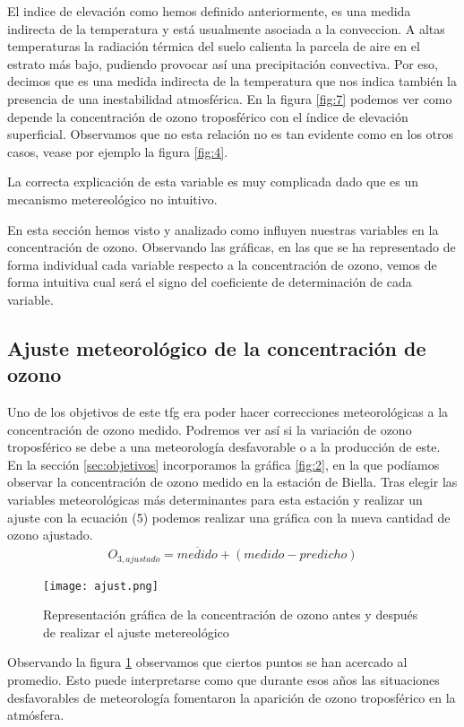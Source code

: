 \documentclass[12pt]{article}
\begin{document}
El indice de elevación como hemos definido anteriormente, es una medida indirecta de la temperatura y está usualmente asociada a la conveccion. A altas temperaturas la radiación térmica del suelo calienta la parcela de aire en el estrato más bajo, pudiendo provocar así una precipitación convectiva. Por eso, decimos que es una medida indirecta de la temperatura que nos indica también la presencia de una inestabilidad atmosférica. En la figura \ref{fig:7} podemos ver como depende la concentración de ozono troposférico con el índice de elevación superficial. Observamos que no esta relación no es tan evidente como en los otros casos, vease por ejemplo la figura \ref{fig:4}.

La correcta explicación de esta variable es muy complicada dado que es un mecanismo metereológico no intuitivo.

En esta sección hemos visto y analizado como influyen nuestras variables en la concentración de ozono. Observando las gráficas, en las que se ha representado de forma individual cada variable respecto  a la concentración de ozono, vemos de forma intuitiva cual será el signo del coeficiente de determinación de cada variable.
\subsection{Ajuste meteorológico de la concentración de ozono}
Uno de los objetivos de este tfg era poder hacer correcciones meteorológicas a la concentración de ozono medido. Podremos ver así si  la variación de ozono troposférico se debe a una meteorología desfavorable o a la producción de este. En la sección \ref{sec:objetivos} incorporamos la gráfica \ref{fig:2}, en la que podíamos observar la concentración de ozono medido en la estación de Biella. Tras elegir las variables meteorológicas más determinantes para esta estación  y realizar un ajuste con la ecuación  (5) podemos realizar una gráfica con la nueva cantidad de ozono ajustado.
\begin{eqnarray}
O_{3,ajustado}=\overline{medido}+ (medido -  predicho)
\end{eqnarray}
\begin{figure}[h]
\centering
    \texttt{[image: ajust.png]}
    \caption[Ozono en Biella antes y depués de los ajustes metereológicos]{Representación gráfica de la concentración de ozono antes y después de realizar el ajuste metereológico} \label{fig:8}
\end{figure}


Observando la figura \ref{fig:8} observamos que ciertos puntos se han acercado al promedio. Esto puede interpretarse como que  durante esos años  las situaciones desfavorables de meteorología fomentaron la aparición de ozono troposférico en la atmósfera.
\end{document}
